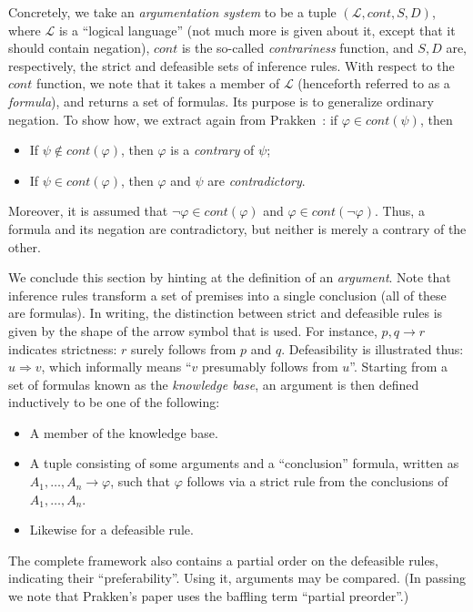 \documentclass[12pt, a4paper]{article}
\begin{document}
Concretely, we take an \emph{argumentation system} to be a tuple \( (\mathcal{L}, \mathit{cont}, S, D) \), where $\mathcal{L}$ is a ``logical language'' (not much more is given about it, except that it should contain negation), $\mathit{cont}$ is the so-called \emph{contrariness} function, and $S, D$ are, respectively, the strict and defeasible sets of inference rules. With respect to the $cont$ function, we note that it takes a member of $\mathcal{L}$ (henceforth referred to as a \emph{formula}), and returns a set of formulas. Its purpose is to generalize ordinary negation. To show how, we extract again from Prakken~\cite[page 97]{prakken}: if \( \varphi \in \mathit{cont}(\psi) \), then
\begin{itemize}
\item If \( \psi \not\in \mathit{cont}(\varphi) \), then $\varphi$ is a \emph{contrary} of $\psi$;
\item If \( \psi \in \mathit{cont}(\varphi) \), then $\varphi$ and $\psi$ are \emph{contradictory}.
\end{itemize}
Moreover, it is assumed that \( \neg\varphi \in \mathit{cont}(\varphi) \) and \( \varphi \in \mathit{cont}(\neg\varphi) \). Thus, a formula and its negation are contradictory, but neither is merely a contrary of the other.

We conclude this section by hinting at the definition of an \emph{argument}. Note that inference rules transform a set of premises into a single conclusion (all of these are formulas). In writing, the distinction between strict and defeasible rules is given by the shape of the arrow symbol that is used. For instance, \( p, q \rightarrow r \) indicates strictness: $r$ surely follows from $p$ and $q$. Defeasibility is illustrated thus: \( u \Rightarrow v \), which informally means ``$v$ presumably follows from $u$''. Starting from a set of formulas known as the \emph{knowledge base}, an argument is then defined inductively to be one of the following:
\begin{itemize}
\item A member of the knowledge base.
\item A tuple consisting of some arguments and a ``conclusion'' formula, written as \( A_{1},\ldots,A_{n} \rightarrow \varphi \), such that $\varphi$ follows via a strict rule from the conclusions of $A_{1},\ldots,A_{n}$.
\item Likewise for a defeasible rule.
\end{itemize}
The complete framework also contains a partial order on the defeasible rules, indicating their ``preferability''. Using it, arguments may be compared. (In passing we note that Prakken's paper uses the baffling term ``partial preorder''.)
\end{document}
